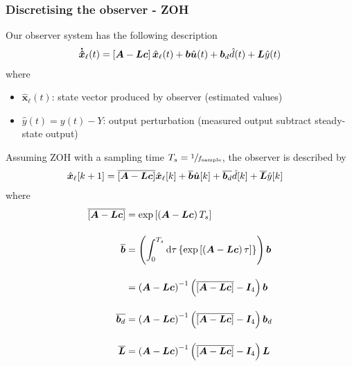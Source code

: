 \subsubsection{Discretising the observer - ZOH}
Our observer system has the following description
\begin{align*}
\boldsymbol{\dot{\hat{x}}}_\ell (t) = \left[\boldsymbol{A} - \boldsymbol{L}\boldsymbol{c}\right]\hat{\boldsymbol{x}}_\ell(t) + \boldsymbol{b}\hat{\boldsymbol{u}}(t) + \boldsymbol{b}_d \hat{d}(t) + \boldsymbol{L}\hat{y}(t)
\end{align*}
where
\begin{itemize}
\item $\hat{\boldsymbol{x}}_\ell(t)$: state vector produced by observer (estimated values)
\item $\hat{y}(t) = y(t) - Y$: output perturbation (measured output subtract steady-state output)
\end{itemize}
Assuming ZOH with a sampling time $T_s = \sfrac{1}{f_\text{sample}}$, the observer is described  by
\begin{align*}
\hat{\boldsymbol{x}}_\ell [k + 1] &= \overline{\left[\boldsymbol{A} - \boldsymbol{L}\boldsymbol{c}\right]}\hat{\boldsymbol{x}}_\ell[k] + \overline{\boldsymbol{b}}\hat{\boldsymbol{u}}[k] + \overline{\boldsymbol{b}_d} \hat{d}[k] + \overline{\boldsymbol{L}}\hat{y}[k]
\end{align*}
where
\begin{align*}
\overline{\left[\boldsymbol{A} - \boldsymbol{L}\boldsymbol{c}\right]} &= \exp \left[\left(\boldsymbol{A} - \boldsymbol{L}\boldsymbol{c}\right)T_s\right]
\\[11pt]
\overline{\boldsymbol{b}} &= \left(\int_0^{T_s} \mathrm{d}\tau \left\{\exp \left[\left(\boldsymbol{A} - \boldsymbol{L}\boldsymbol{c}\right)\tau\right]\right\}\right)\boldsymbol{b}
\\[11pt]
&= \left(\boldsymbol{A} - \boldsymbol{L}\boldsymbol{c}\right)^{-1}
\left(\overline{\left[\boldsymbol{A} - \boldsymbol{L}\boldsymbol{c}\right]} - \boldsymbol{I}_4\right)
\boldsymbol{b}
\\[11pt]
\overline{\boldsymbol{b}_d} &=
\left(\boldsymbol{A} - \boldsymbol{L}\boldsymbol{c}\right)^{-1}
\left(\overline{\left[\boldsymbol{A} - \boldsymbol{L}\boldsymbol{c}\right]} - \boldsymbol{I}_4\right)
\boldsymbol{b}_d
\\[11pt]
\overline{\boldsymbol{L}} &=
\left(\boldsymbol{A} - \boldsymbol{L}\boldsymbol{c}\right)^{-1}
\left(\overline{\left[\boldsymbol{A} - \boldsymbol{L}\boldsymbol{c}\right]} - \boldsymbol{I}_4\right)
\boldsymbol{L}
\end{align*}
